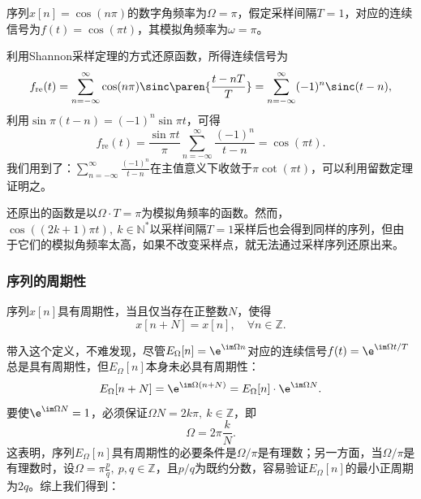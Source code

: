 \begin{example}
    序列$x[n]=\cos(n\pi)$的数字角频率为$\Omega=\pi$，假定采样间隔$T=1$，对应的连续信号为$f(t)=\cos(\pi t)$，其模拟角频率为$\omega=\pi$。

    利用Shannon采样定理的方式还原函数，所得连续信号为
    \begin{equation}
        f_{\mathrm{re}}(t)=\sum_{n=-\infty}^{\infty}\cos(n\pi)\sinc\paren{\frac{t-nT}{T}}=\sum_{n=-\infty}^{\infty}(-1)^n\sinc(t-n),
    \end{equation}
    利用$\sin\pi(t-n)=(-1)^n\sin\pi t$，可得
    \begin{equation}
        f_{\mathrm{re}}(t)=\frac{\sin\pi t}{\pi}\sum_{n=-\infty}^{\infty}\frac{(-1)^n}{t-n}=\cos(\pi t).
    \end{equation}
    我们用到了：$\displaystyle\sum_{n=-\infty}^{\infty}\frac{(-1)^n}{t-n}$在主值意义下收敛于$\pi\cot(\pi t)$，可以利用留数定理证明之。

    还原出的函数是以$\Omega\cdot T=\pi$为模拟角频率的函数。然而，$\cos((2k+1)\pi t),\ k\in\mathbb{N}^*$以采样间隔$T=1$采样后也会得到同样的序列，但由于它们的模拟角频率太高，如果不改变采样点，就无法通过采样序列还原出来。
\end{example}

\subsubsection{序列的周期性}

\begin{definition}[序列的周期性]
    序列$x[n]$具有周期性，当且仅当存在正整数$N$，使得
    \begin{equation}
        x[n+N]=x[n],\quad \forall n\in\mathbb{Z}.
    \end{equation}
\end{definition}

带入这个定义，不难发现，尽管$E_{\Omega}[n]=\e^{\im\Omega n}$对应的连续信号$f(t)=\e^{\im\Omega t/T}$总是具有周期性，但$E_{\Omega}[n]$本身未必具有周期性：
\begin{equation}
    E_{\Omega}[n+N]=\e^{\im\Omega(n+N)}=E_{\Omega}[n]\cdot \e^{\im\Omega N}.
\end{equation}
要使$\e^{\im\Omega N}=1$，必须保证$\Omega N=2k\pi,\ k\in\mathbb{Z}$，即
\begin{equation}
    \Omega=2\pi\frac{k}{N}.
\end{equation}
这表明，序列$E_{\Omega}[n]$具有周期性的必要条件是$\Omega/\pi$是有理数；另一方面，当$\Omega/\pi$是有理数时，设$\Omega=\pi\displaystyle\frac{p}{q},\ p,q\in\mathbb{Z}$，且$p/q$为既约分数，容易验证$E_{\Omega}[n]$的最小正周期为$2q$。综上我们得到：

